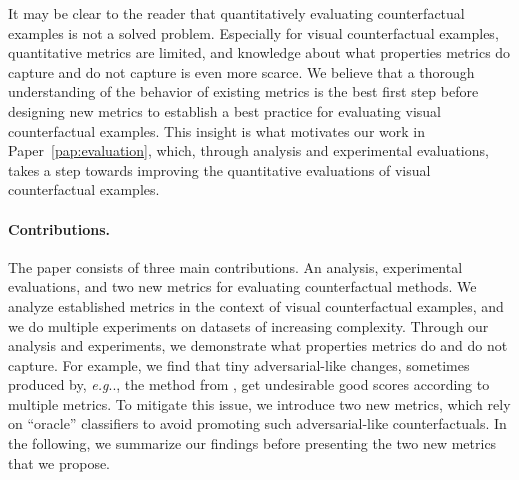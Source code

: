 \documentclass[11pt,a4paper,twoside,openright,final]{memoir}
\makeatletter
\DeclareRobustCommand\onedot{\futurelet\@let@token\@onedot}
\def\@onedot{\ifx\@let@token.\else.\null\fi\xspace}
\def\eg{\emph{e.g}\onedot} \def\Eg{\emph{E.g}\onedot}
\newcommand*{\paperref}[1]{Paper~\hyperref[#1]{\ref{#1}}}
\makeatother
\begin{document}
It may be clear to the reader that quantitatively evaluating counterfactual examples is not a solved problem.
Especially for visual counterfactual examples, quantitative metrics are limited, and knowledge about what properties metrics do capture and do not capture is even more scarce.
We believe that a thorough understanding of the behavior of existing metrics is the best first step before designing new metrics to establish a best practice for evaluating visual counterfactual examples.
This insight is what motivates our work in \paperref{pap:evaluation}, which, through analysis and experimental evaluations, takes a step towards improving the quantitative evaluations of visual counterfactual examples.

\paragraph{Contributions.}
The paper consists of three main contributions.
An analysis, experimental evaluations, and two new metrics for evaluating counterfactual methods.
We analyze established metrics in the context of visual counterfactual examples, and we do multiple experiments on datasets of increasing complexity. 
Through our analysis and experiments, we demonstrate what properties metrics do and do not capture. 
For example, we find that tiny adversarial-like changes, sometimes produced by, \eg, the method from \cite{Wachter2017}, get undesirable good scores according to multiple metrics.
To mitigate this issue, we introduce two new metrics, which rely on ``oracle'' classifiers to avoid promoting such adversarial-like counterfactuals.
In the following, we summarize our findings before presenting the two new metrics that we propose.

\end{document}
